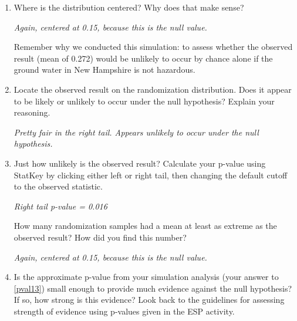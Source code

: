 \begin{enumerate}
\item 
 Where is the distribution centered?  Why does that make sense?
\begin{students}
  \vspace{1cm}
\end{students}

\begin{key}
  {\it Again, centered at 0.15, because this is the null value. }
\end{key}

Remember why we conducted this simulation: to assess whether the
observed result (mean of 0.272) would be unlikely to occur by chance
alone if the ground water in New Hampshire is not hazardous. 

\item Locate the observed result on the randomization distribution.
  Does it appear to be likely or unlikely to occur under the null
  hypothesis?  Explain your reasoning.
\begin{students}
  \vspace{1cm}
\end{students}

\begin{key}
  {\it Pretty fair in the right tail.  Appears unlikely to occur under
    the null hypothesis. } 
\end{key}

\item \label{pval13}Just how unlikely is the observed result?  Calculate your
  p-value using StatKey by clicking either left or right tail, then
  changing the default cutoff to the observed statistic. 
\begin{students}
  \vspace{1cm}
\end{students}

\begin{key}
  {\it Right tail p-value = 0.016}
\end{key}


 How many randomization samples had a mean at least as extreme as the observed result?  How did you find this number?
\begin{students}
  \vspace{1cm}
\end{students}

\begin{key}
  {\it Again, centered at 0.15, because this is the null value. }
\end{key}

\item Is the approximate p-value from your simulation analysis (your
  answer to \ref{pval13}) small enough to provide much evidence against the
  null hypothesis? If so, how strong is this evidence?  Look back to
  the guidelines for assessing strength of evidence using p-values
  given in the ESP activity.
\begin{students}
  \vspace{1cm}
\end{students}


\end{enumerate}
